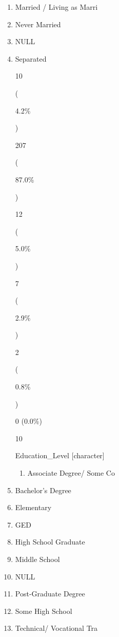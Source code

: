 \documentclass[]{article}
\providecommand{\tightlist}{%
  \setlength{\itemsep}{0pt}\setlength{\parskip}{0pt}}
\begin{document}
\begin{enumerate}
  (

  10.6\%

  )

  5

  :

  4

  (

  1.7\%

  )

  3 (1.3\%)

  9

  Marital\_Status {[}character{]}

  \begin{enumerate}
  \def\labelenumii{\arabic{enumii}.}
  \tightlist
  \item
    Divorced
  \end{enumerate}
\item
  Married / Living as Marri
\item
  Never Married
\item
  NULL
\item
  Separated

  10

  (

  4.2\%

  )

  207

  (

  87.0\%

  )

  12

  (

  5.0\%

  )

  7

  (

  2.9\%

  )

  2

  (

  0.8\%

  )

  0 (0.0\%)

  10

  Education\_Level {[}character{]}

  \begin{enumerate}
  \def\labelenumii{\arabic{enumii}.}
  \tightlist
  \item
    Associate Degree/ Some Co
  \end{enumerate}
\item
  Bachelor's Degree
\item
  Elementary
\item
  GED
\item
  High School Graduate
\item
  Middle School
\item
  NULL
\item
  Post-Graduate Degree
\item
  Some High School
\item
  Technical/ Vocational Tra


\end{enumerate}
\end{document}
